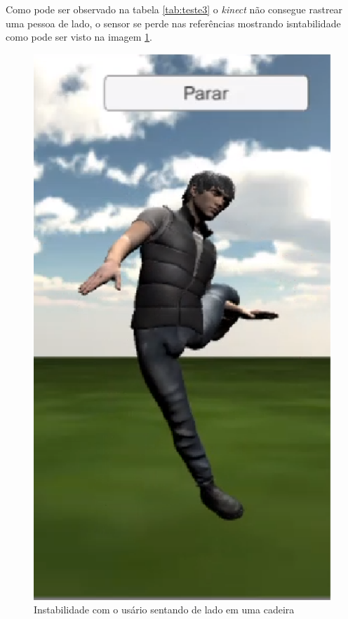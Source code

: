 Como pode ser observado na tabela \ref{tab:teste3} o \textit{kinect} não consegue rastrear uma pessoa de lado, o sensor se perde nas referências mostrando isntabilidade como pode ser
visto na imagem \ref{img:teste3}.

\begin{figure}[H]
\centering
\includegraphics [keepaspectratio=true,scale=0.60]{figuras/cadeira.eps}
\caption{Instabilidade com o usário sentando de lado em uma cadeira}
\label{img:teste3}
\end{figure}

